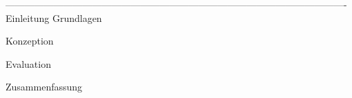 \documentclass[12pt,a4paper,bibliography=totocnumbered,listof=totocnumbered]{scrartcl}
\numberwithin{figure}{section} %
\numberwithin{table}{section} %
\begin{document}
%
\ifoptionfinal{}{\linenumbers}
 ----------------------------------------------------------------------------------------------------------
{Einleitung}
\pagebreak
{Grundlagen}
\pagebreak

{Konzeption}

\pagebreak

{Evaluation}

\pagebreak

{Zusammenfassung}

\pagebreak
\nolinenumbers
\renewcommand\refname{Quellenverzeichnis}

\printbibliography
\pagebreak
\end{document}
